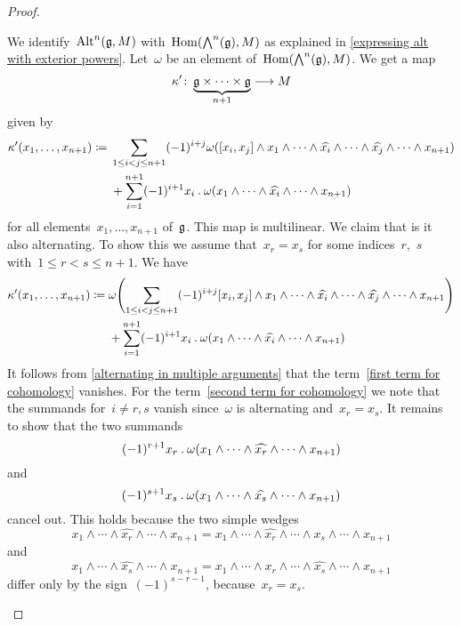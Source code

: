 \begin{proof}
\begin{enumerate}
      We identify~$\operatorname{Alt}^n(\mathfrak{g}, M)$ with~$\operatorname{Hom}( \operatorname{\bigwedge}^n(\mathfrak{g}), M)$ as explained in \cref{expressing alt with exterior powers}.
      Let~$\omega$ be an element of~$\operatorname{Hom}( \operatorname{\bigwedge}^n(\mathfrak{g}), M )$.
      We get a map
      \[
        \kappa'
        \colon
        \underbrace{ \glie \times \dotsb \times \glie }_{n+1}
        \to
        M
      \]
      given by
      \begin{align*}
        \kappa'(x_1, \dotsc, x_{n+1})
        \coloneqq
        {}&
        \sum_{1 \leq i < j \leq n+1}
        (-1)^{i+j}
        \omega
        (
          [x_i, x_j] \wedge x_1 \wedge \dotsb \wedge \widehat{x_i} \wedge \dotsb \wedge \widehat{x_j} \wedge \dotsb \wedge x_{n+1}
        )
        \\
        {}&
        +
        \sum_{i=1}^{n+1}
        (-1)^{i+1}
        x_i \mathbin{.} \omega(x_1 \wedge \dotsb \wedge \widehat{x_i} \wedge \dotsb \wedge x_{n+1})
      \end{align*}
      for all elements~$x_1, \dotsc, x_{n+1}$ of~$\mathfrak{g}$.
      This map is multilinear.
      We claim that is it also alternating.
      To show this we assume that~$x_r = x_s$ for some indices~$r$,~$s$ with~$1 \leq r < s \leq n+1$.
      We have
      \begin{align}
        \kappa'(x_1, \dotsc, x_{n+1})
        \coloneqq
        {}&
        \omega
        \Biggl(
          \sum_{1 \leq i < j \leq n+1}
          (-1)^{i+j}
          [x_i, x_j] \wedge x_1 \wedge \dotsb \wedge \widehat{x_i} \wedge \dotsb \wedge \widehat{x_j} \wedge \dotsb \wedge x_{n+1}
        \Biggr)
        \label{first term for cohomology}
        \\
        {}&
        +
        \sum_{i=1}^{n+1}
        (-1)^{i+1}
        x_i \mathbin{.} \omega(x_1 \wedge \dotsb \wedge \widehat{x_i} \wedge \dotsb \wedge x_{n+1})
        \label{second term for cohomology}
      \end{align}
      It follows from \cref{alternating in multiple arguments} that the term~\eqref{first term for cohomology} vanishes.
      For the term~\eqref{second term for cohomology} we note that the summands for~$i \neq r,s$ vanish since~$\omega$ is alternating and~$x_r = x_s$.
      It remains to show that the two summands
      \[
        (-1)^{r+1}
        x_r \mathbin{.} \omega(x_1 \wedge \dotsb \wedge \widehat{x_r} \wedge \dotsb \wedge x_{n+1})
      \]
      and
      \[
        (-1)^{s+1}
        x_s \mathbin{.} \omega(x_1 \wedge \dotsb \wedge \widehat{x_s} \wedge \dotsb \wedge x_{n+1})
      \]
      cancel out.
      This holds because the two simple wedges
      \[
        x_1 \wedge \dotsb \wedge \widehat{x_r} \wedge \dotsb \wedge x_{n+1}
        =
        x_1 \wedge \dotsb \wedge \widehat{x_r} \wedge \dotsb \wedge x_s \wedge \dotsb \wedge x_{n+1}
      \]
      and
      \[
        x_1 \wedge \dotsb \wedge \widehat{x_s} \wedge \dotsb \wedge x_{n+1}
        =
        x_1 \wedge \dotsb \wedge x_r \wedge \dotsb \wedge \widehat{x_s} \wedge \dotsb \wedge x_{n+1}
      \]
      differ only by the sign~$(-1)^{s-r-1}$, because~$x_r = x_s$.


\end{enumerate}
\end{proof}
